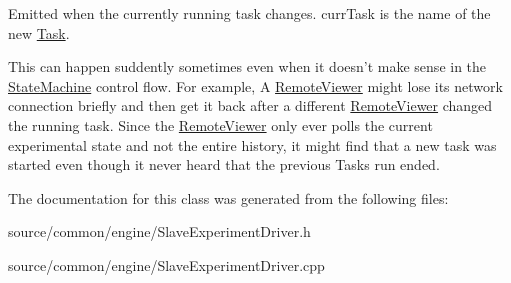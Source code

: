 Emitted when the currently running task changes. curr\-Task is the name of the new \hyperlink{class_picto_1_1_task}{Task}. 

This can happen suddently sometimes even when it doesn't make sense in the \hyperlink{class_picto_1_1_state_machine}{State\-Machine} control flow. For example, A \hyperlink{class_remote_viewer}{Remote\-Viewer} might lose its network connection briefly and then get it back after a different \hyperlink{class_remote_viewer}{Remote\-Viewer} changed the running task. Since the \hyperlink{class_remote_viewer}{Remote\-Viewer} only ever polls the current experimental state and not the entire history, it might find that a new task was started even though it never heard that the previous Tasks run ended. 

The documentation for this class was generated from the following files\-:\begin{DoxyCompactItemize}
\item 
source/common/engine/Slave\-Experiment\-Driver.\-h\item 
source/common/engine/Slave\-Experiment\-Driver.\-cpp\end{DoxyCompactItemize}
